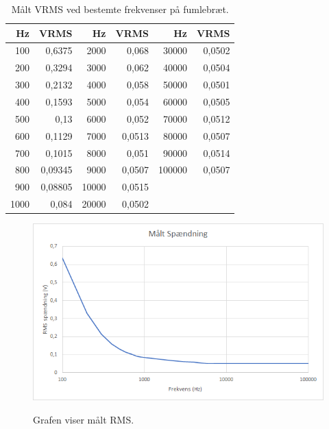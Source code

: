 \begin{table}[H]
\centering
\begin{tabular}{| r | r || r | r || r | r |}
    \hline
    \textbf{Hz} & \textbf{VRMS} & \textbf{Hz} & \textbf{VRMS} & \textbf{Hz} & \textbf{VRMS}\\ \hline
    100 & 0,6375 & 2000 & 0,068 & 30000 & 0,0502 \\ \hline
    200 & 0,3294 & 3000 & 0,062 & 40000 & 0,0504   \\ \hline
    300 & 0,2132 & 4000 & 0,058 & 50000 & 0,0501   \\ \hline
    400 & 0,1593 & 5000 & 0,054 & 60000 & 0,0505   \\ \hline
    500 & 0,13 & 6000 & 0,052 & 70000 & 0,0512  \\ \hline
    600 & 0,1129 & 7000 & 0,0513 & 80000 & 0,0507   \\ \hline
    700 & 0,1015 & 8000 & 0,051 & 90000 & 0,0514  \\ \hline
    800 & 0,09345 & 9000 & 0,0507 & 100000 & 0,0507   \\ \hline
    900 & 0,08805 & 10000 & 0,0515 &  &     \\ \hline
    1000 & 0,084 & 20000 & 0,0502 & &   \\ \hline
\end{tabular}
    \caption{Målt VRMS ved bestemte frekvenser på fumlebræt.}
    \label{table:fumlebraetfrekvenservrms}
\end{table} 






\begin{figure}[H]
\centering
{\includegraphics[width=\linewidth]
{Figure/testopstilling1fumlevrmsgraf}}
\caption{Grafen viser målt RMS.}
\label{analyse1}
\end{figure}








